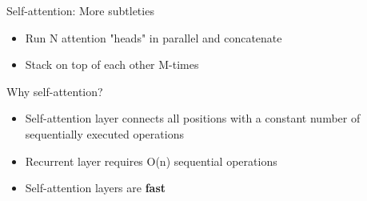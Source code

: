 \documentclass[12pt,aspectratio=169,handout]{beamer}
\begin{document}
\begin{frame}{Self-attention: More subtleties}
	
	\begin{itemize}
		\item Run N attention "heads" in parallel and concatenate
		\item Stack on top of each other M-times
	\end{itemize}
	
	
	Why self-attention?
	
	\begin{itemize}
		\item Self-attention layer connects all positions with a constant number of sequentially executed operations
		\item Recurrent layer requires O(n) sequential operations
		\item Self-attention layers are \textbf{fast}
	\end{itemize}
	
	\begin{footnotesize}
	\end{footnotesize}
	
	
\end{frame}
\end{document}
